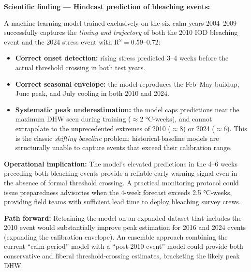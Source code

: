 \documentclass[12pt,a4paper]{report}
\begin{document}
\begin{findingbox}
\textbf{Scientific finding --- Hindcast prediction of bleaching events:}

\vspace{4pt}
A machine-learning model trained exclusively on the six calm years 2004--2009
successfully captures the \textit{timing and trajectory} of both the 2010 IOD
bleaching event and the 2024 stress event with R$^2 = 0.59$--$0.72$:

\begin{itemize}[leftmargin=*, nosep]
  \item \textbf{Correct onset detection:} rising stress predicted 3--4 weeks before
    the actual threshold crossing in both test years.
  \item \textbf{Correct seasonal envelope:} the model reproduces the Feb--May buildup,
    June peak, and July cooling in both 2010 and 2024.
  \item \textbf{Systematic peak underestimation:} the model caps predictions near the
    maximum DHW seen during training ($\approx 2$ °C-weeks), and cannot extrapolate
    to the unprecedented extremes of 2010 ($\approx 8$) or 2024 ($\approx 6$).
    This is the classic \textit{shifting baseline} problem: historical-baseline models
    are structurally unable to capture events that exceed their calibration range.
\end{itemize}

\vspace{4pt}
\textbf{Operational implication:} The model's elevated predictions in the 4--6 weeks
preceding both bleaching events provide a reliable early-warning signal even in the
absence of formal threshold crossing.  A practical monitoring protocol could issue
preparedness advisories when the 4-week forecast exceeds 2.5 °C-weeks, providing
field teams with sufficient lead time to deploy bleaching survey crews.

\vspace{4pt}
\textbf{Path forward:} Retraining the model on an expanded dataset that includes the
2010 event would substantially improve peak estimation for 2016 and 2024 events
(expanding the calibration envelope).  An ensemble approach combining the current
``calm-period'' model with a ``post-2010 event'' model could provide both conservative
and liberal threshold-crossing estimates, bracketing the likely peak DHW.
\end{findingbox}

\end{document}

